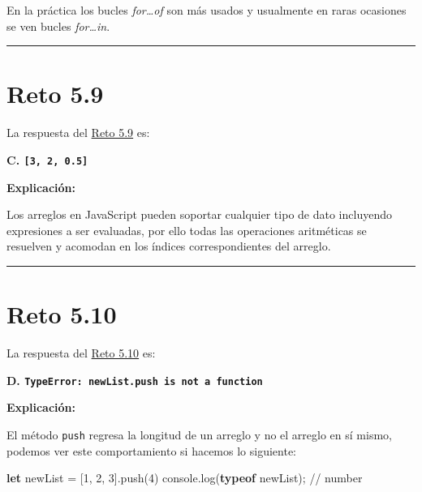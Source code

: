 \documentclass[
  letterpaper,
  DIV=11,
  numbers=noendperiod]{scrreprt}
\newenvironment{Shaded}{\begin{snugshade}}{\end{snugshade}}
\newcommand{\BuiltInTok}[1]{\textcolor[rgb]{0.00,0.23,0.31}{#1}}
\newcommand{\CommentTok}[1]{\textcolor[rgb]{0.37,0.37,0.37}{#1}}
\newcommand{\DecValTok}[1]{\textcolor[rgb]{0.68,0.00,0.00}{#1}}
\newcommand{\FunctionTok}[1]{\textcolor[rgb]{0.28,0.35,0.67}{#1}}
\newcommand{\KeywordTok}[1]{\textcolor[rgb]{0.00,0.23,0.31}{\textbf{#1}}}
\newcommand{\NormalTok}[1]{\textcolor[rgb]{0.00,0.23,0.31}{#1}}
\newcommand{\OperatorTok}[1]{\textcolor[rgb]{0.37,0.37,0.37}{#1}}
\begin{document}
En la práctica los bucles \emph{for\ldots of} son más usados y
usualmente en raras ocasiones se ven bucles \emph{for\ldots in}.

\begin{center}\rule{0.5\linewidth}{0.5pt}\end{center}

\section{Reto 5.9}\label{sec-sol-cap5-reto9}

La respuesta del \hyperref[sec-cap5-reto9]{Reto 5.9} es:

\textbf{C. \texttt{{[}3,\ 2,\ 0.5{]}}}

\textbf{Explicación:}

Los arreglos en JavaScript pueden soportar cualquier tipo de dato
incluyendo expresiones a ser evaluadas, por ello todas las operaciones
aritméticas se resuelven y acomodan en los índices correspondientes del
arreglo.

\begin{center}\rule{0.5\linewidth}{0.5pt}\end{center}

\section{Reto 5.10}\label{sec-sol-cap5-reto10}

La respuesta del \hyperref[sec-cap5-reto10]{Reto 5.10} es:

\textbf{D. \texttt{TypeError:\ newList.push\ is\ not\ a\ function}}

\textbf{Explicación:}

El método \texttt{push} regresa la longitud de un arreglo y no el
arreglo en sí mismo, podemos ver este comportamiento si hacemos lo
siguiente:

\begin{Shaded}
\begin{Highlighting}[]
\KeywordTok{let}\NormalTok{ newList }\OperatorTok{=}\NormalTok{ [}\DecValTok{1}\OperatorTok{,} \DecValTok{2}\OperatorTok{,} \DecValTok{3}\NormalTok{]}\OperatorTok{.}\FunctionTok{push}\NormalTok{(}\DecValTok{4}\NormalTok{)}
\BuiltInTok{console}\OperatorTok{.}\FunctionTok{log}\NormalTok{(}\KeywordTok{typeof}\NormalTok{ newList)}\OperatorTok{;} \CommentTok{// number}
\end{Highlighting}
\end{Shaded}
\end{document}
